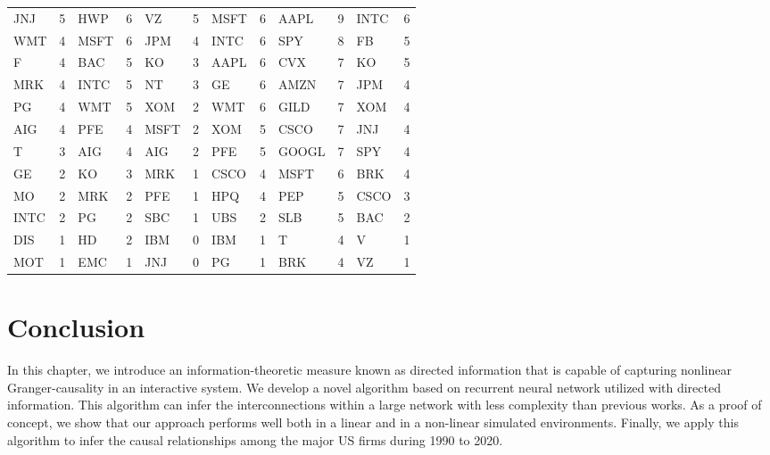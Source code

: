 \begin{table}[]
{\begin{tabular}{|ll|ll|ll|ll|ll|ll|}
JNJ  & 5  & HWP  & 6  & VZ   & 5  & MSFT & 6  & AAPL  & 9  & INTC  & 6  \\
WMT  & 4  & MSFT & 6  & JPM  & 4  & INTC & 6  & SPY   & 8  & FB    & 5  \\
F    & 4  & BAC  & 5  & KO   & 3  & AAPL & 6  & CVX   & 7  & KO    & 5  \\
MRK  & 4  & INTC & 5  & NT   & 3  & GE   & 6  & AMZN  & 7  & JPM   & 4  \\
PG   & 4  & WMT  & 5  & XOM  & 2  & WMT  & 6  & GILD  & 7  & XOM   & 4  \\
AIG  & 4  & PFE  & 4  & MSFT & 2  & XOM  & 5  & CSCO  & 7  & JNJ   & 4  \\
T    & 3  & AIG  & 4  & AIG  & 2  & PFE  & 5  & GOOGL & 7  & SPY   & 4  \\
GE   & 2  & KO   & 3  & MRK  & 1  & CSCO & 4  & MSFT  & 6  & BRK   & 4  \\
MO   & 2  & MRK  & 2  & PFE  & 1  & HPQ  & 4  & PEP   & 5  & CSCO  & 3  \\
INTC & 2  & PG   & 2  & SBC  & 1  & UBS  & 2  & SLB   & 5  & BAC   & 2  \\
DIS  & 1  & HD   & 2  & IBM  & 0  & IBM  & 1  & T     & 4  & V     & 1  \\
MOT  & 1  & EMC  & 1  & JNJ  & 0  & PG   & 1  & BRK   & 4  & VZ    & 1  \\ \hline
\end{tabular}}
\label{indegree}
\end{table}

\section{Conclusion}\label{sec:con}

In this chapter, we introduce an information-theoretic measure known as directed information that is capable of capturing nonlinear Granger-causality in an interactive system. 
We develop a novel algorithm based on recurrent neural network utilized with directed information. 
This algorithm can infer the interconnections within a large network with less complexity than previous works. As a proof of concept, we show that our approach performs well both in a linear and in a non-linear simulated environments. Finally, we apply this algorithm to infer the causal relationships among the major US firms during 1990 to 2020. 

 
 




